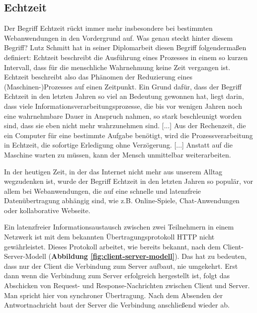 \subsection{Echtzeit}
\label{sec:echtzeit}
Der Begriff \glqq Echtzeit\grqq{} rückt immer mehr insbesondere bei bestimmten Webanwendungen in den Vordergrund auf. Was genau steckt hinter diesem Begriff? Lutz Schmitt hat in seiner Diplomarbeit diesen Begriff folgendermaßen definiert: \glqq Echtzeit beschreibt die Ausführung eines Prozesses in einem so kurzen Intervall, dass für die menschliche Wahrnehmung keine Zeit vergangen ist. Echtzeit beschreibt also das Phänomen der Reduzierung eines (Maschinen-)Prozesses auf einen Zeitpunkt.\grqq{} Ein Grund dafür, dass der Begriff Echtzeit in den letzten Jahren so viel an Bedeutung gewonnen hat, liegt darin, \glqq [...] dass viele Informationsverarbeitungsprozesse, die bis vor wenigen Jahren noch eine wahrnehmbare Dauer in Anspruch nahmen, so stark beschleunigt worden sind, dass sie eben nicht mehr wahrzunehmen sind. [...] Aus der Rechenzeit, die ein Computer für eine bestimmte Aufgabe benötigt, wird die Prozessverarbeitung in Echtzeit, die sofortige Erledigung ohne Verzögerung. [...] Anstatt auf die Maschine warten zu müssen, kann der Mensch unmittelbar weiterarbeiten.\grqq{} \cite{Lutz2006}\bigskip

In der heutigen Zeit, in der das Internet nicht mehr aus unserem Alltag wegzudenken ist, wurde der Begriff Echtzeit in den letzten Jahren so populär, vor allem bei Webanwendungen, die auf eine schnelle und latenzfreie Datenübertragung abhängig sind, wie z.B. Online-Spiele, Chat-Anwendungen oder kollaborative Webseite.

\newpage
Ein latenzfreier Informationsaustausch zwischen zwei Teilnehmern in einem Netzwerk ist mit dem bekannten Übertragungsprotokoll HTTP nicht gewährleistet. Dieses Protokoll arbeitet, wie bereits bekannt, nach dem Client-Server-Modell (\textbf{Abbildung \ref{fig:client-server-modell}}). Das hat zu bedeuten, dass nur der Client die Verbindung zum Server aufbaut, nie umgekehrt. Erst dann wenn die Verbindung zum Server erfolgreich hergestellt ist, folgt das Abschicken von Request- und Response-Nachrichten zwischen Client und Server. Man spricht hier von synchroner Übertragung. Nach dem Absenden der Antwortnachricht baut der Server die Verbindung anschließend wieder ab.\bigskip

